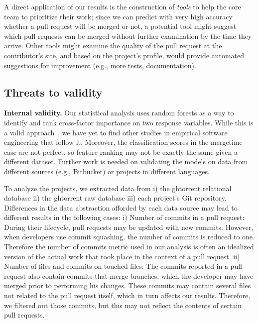 \documentclass{sig-alternate}
\begin{document}

A direct application of our results is the construction of \emph{tools}
to help the core team to prioritize their work; since we can predict
with very high accuracy whether a pull request will be merged or not, a
potential tool might suggest which pull requests can be merged without further
examination by the time they arrive. Other tools might examine the quality of
the pull request at the contributor's site, and based on the project's
profile, would provide automated suggestions for improvement (e.g., more tests,
documentation). 

\subsection{Threats to validity}

\textbf{Internal validity.} Our statistical analysis uses random forests as a way
to identify and rank cross-factor importance on two response variables. While
this is a valid approach~\cite{Genue10}, we have yet to find other studies in
empirical software engineering that follow it. Moreover, the classification
scores in the \textsf{mergetime} case are not perfect, so feature ranking may
not be exactly the same given a different dataset. Further work is needed on
validating the models on data from different sources (e.g., Bitbucket) or projects in different languages. 

To analyze the projects, we extracted data from i) the {\sc ght}orrent relational
database ii) the {\sc ght}orrent raw database iii) each project's Git repository.
Differences in the data abstraction afforded by each data source may
lead to different results in the following cases: 
i) Number of commits in a pull request: During their lifecycle, pull requests
may be updated with new commits. However, when developers use commit squashing,
the number of commits is reduced to one. Therefore the number of commits metric
used in our analysis is often an idealized version of the actual work
that took place in the context of a pull request.
ii) Number of files and commits on touched files: The commits reported
in a pull request also contain commits that merge branches, which the
developer may have merged prior to performing his changes. These commits
may contain several files not related to the pull request itself, which
in turn affects our results. Therefore, we  
filtered out those commits, but this may not reflect the contents of 
certain pull requests.
\end{document}
